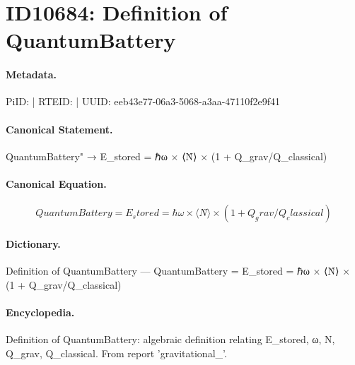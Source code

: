 \section*{ID10684: Definition of QuantumBattery}
\paragraph{Metadata.}
PiID:  | RTEID:  | UUID: eeb43e77-06a3-5068-a3aa-47110f2e9f41

\paragraph{Canonical Statement.}
QuantumBattery" → E\_stored = ℏω × ⟨N̂⟩ × (1 + Q\_grav/Q\_classical)

\paragraph{Canonical Equation.}
\[
QuantumBattery = E_stored = ℏω × ⟨N̂⟩ × (1 + Q_grav/Q_classical)
\]

\paragraph{Dictionary.}
Definition of QuantumBattery — QuantumBattery = E\_stored = ℏω × ⟨N̂⟩ × (1 + Q\_grav/Q\_classical)

\paragraph{Encyclopedia.}
Definition of QuantumBattery: algebraic definition relating E\_stored, ω, N, Q\_grav, Q\_classical. From report 'gravitational\_'.
